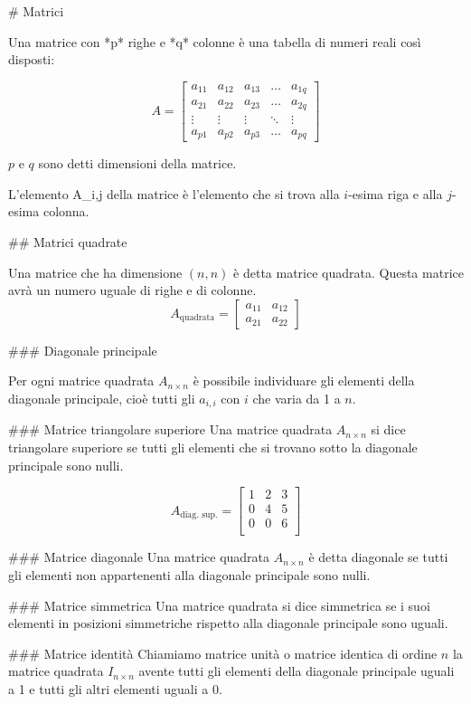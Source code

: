 # Matrici

Una matrice con *p* righe e *q* colonne è una tabella di numeri reali così disposti:

$$
A =
\begin{bmatrix}
    a_{11} & a_{12} & a_{13} & \dots  & a_{1q} \\
    a_{21} & a_{22} & a_{23} & \dots  & a_{2q} \\
    \vdots & \vdots & \vdots & \ddots & \vdots \\
    a_{p1} & a_{p2} & a_{p3} & \dots  & a_{pq}
\end{bmatrix}
$$

$p$ e $q$ sono detti dimensioni della matrice.

L'elemento A_{i,j} della matrice è l'elemento che si trova alla $i$-esima riga e alla $j$-esima colonna.

## Matrici quadrate

Una matrice che ha dimensione $(n,n)$ è detta matrice quadrata. Questa matrice avrà un numero uguale di righe e di colonne.
$$
A_{\text{quadrata}} =
\begin{bmatrix}
    a_{11} & a_{12} \\
    a_{21} & a_{22}
\end{bmatrix}
$$

### Diagonale principale

Per ogni matrice quadrata $A_{n\times n}$ è possibile individuare gli elementi della diagonale principale, cioè tutti gli $a_{i,i}$ con $i$ che varia da 1 a $n$. 

### Matrice triangolare superiore
Una matrice quadrata $A_{n\times n}$ si dice triangolare superiore se tutti gli elementi che si trovano sotto la diagonale principale sono nulli.

$$
A_{\text{diag. sup.}} =
\begin{bmatrix}
    1 & 2 & 3 \\
    0 & 4 & 5 \\
    0 & 0 & 6 \\
\end{bmatrix}
$$

### Matrice diagonale
Una matrice quadrata $A_{n \times n}$ è detta diagonale se tutti gli elementi non appartenenti alla diagonale principale sono nulli.

### Matrice simmetrica 
Una matrice quadrata si dice simmetrica se i suoi elementi in posizioni simmetriche rispetto alla diagonale principale sono uguali.


### Matrice identità
Chiamiamo matrice unità o matrice identica di ordine $n$ la matrice quadrata $I_{n \times n}$ avente tutti gli elementi della diagonale principale uguali a 1 e tutti gli altri elementi uguali a 0. 

